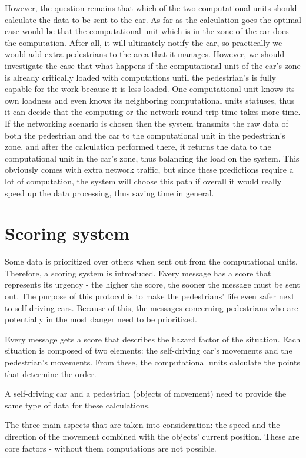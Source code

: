 \documentclass[conference]{IEEEtran}
\begin{document}
However, the question remains that which of the two computational units should calculate the data to be sent to the car. As far as the calculation goes the optimal case would be that the computational unit which is in the zone of the car does the computation. After all, it will ultimately notify the car, so practically we would add extra pedestrians to the area that it manages. However, we should investigate the case that what happens if the computational unit of the car’s zone is already critically loaded with computations until the pedestrian's is fully capable for the work because it is less loaded. One computational unit knows its own loadness and even knows its neighboring computational units statuses, thus it can decide that the computing or the network round trip time takes more time. If the networking scenario is chosen then the system transmits the raw data of both the pedestrian and the car to the computational unit in the pedestrian's zone, and after the calculation performed there, it returns the data to the computational unit in the car’s zone, thus balancing the load on the system. This obviously comes with extra network traffic, but since these predictions require a lot of computation, the system will choose this path if overall it would really speed up the data processing, thus saving time in general.

\section{Scoring system}

Some data is prioritized over others when sent out from the computational units. Therefore, a scoring system is introduced. Every message has a score that represents its urgency - the higher the score, the sooner the message must be sent out. The purpose of this protocol is to make the pedestrians’ life even safer next to self-driving cars. Because of this, the messages concerning pedestrians who are potentially in the most danger need to be prioritized.

Every message gets a score that describes the hazard factor of the situation. Each situation is composed of two elements: the self-driving car's movements and the pedestrian's movements. From these, the computational units calculate the points that determine the order.

A self-driving car and a pedestrian (objects of movement) need to provide the same type of data for these calculations.

The three main aspects that are taken into consideration: the speed and the direction of the movement combined with the objects’ current position. These are core factors - without them computations are not possible.
\end{document}
